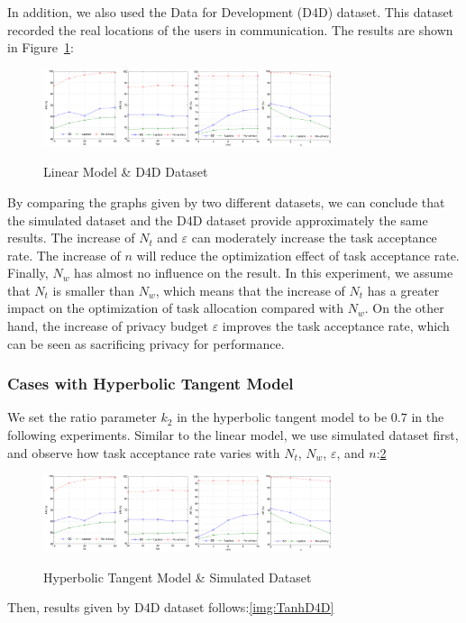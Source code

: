 In addition, we also used the Data for Development (D4D) dataset. This dataset recorded the real locations of the users in communication. The results are shown in Figure~\ref{img:LinD4D}:

\begin{figure}
\includegraphics[width=8.5cm]{LinD4D}
\label{img:LinD4D}
\caption{Linear Model \& D4D Dataset}
\end{figure}

By comparing the graphs given by two different datasets, we can conclude that the simulated dataset and the D4D dataset provide approximately the same results. The increase of $N_t$ and $\varepsilon$ can moderately increase the task acceptance rate. The increase of $n$ will reduce the optimization effect of task acceptance rate. Finally, $N_w$ has almost no influence on the result. In this experiment, we assume that $N_t$ is smaller than $N_w$, which means that the increase of $N_t$ has a greater impact on the optimization of task allocation compared with $N_w$. On the other hand, the increase of privacy budget $\varepsilon$ improves the task acceptance rate, which can be seen as sacrificing privacy for performance.

\subsubsection{Cases with Hyperbolic Tangent Model}
We set the ratio parameter $k_2$ in the hyperbolic tangent model to be $0.7$ in the following experiments. Similar to the linear model, we use simulated dataset first, and observe how task acceptance rate varies with $N_t$, $N_w$, $\varepsilon$, and $n$:\ref{img:TanhSim}

\begin{figure}
\includegraphics[width=8.5cm]{TanhSim}
\label{img:TanhSim}
\caption{Hyperbolic Tangent Model \& Simulated Dataset}
\end{figure}

Then, results given by D4D dataset follows:\ref{img:TanhD4D}

